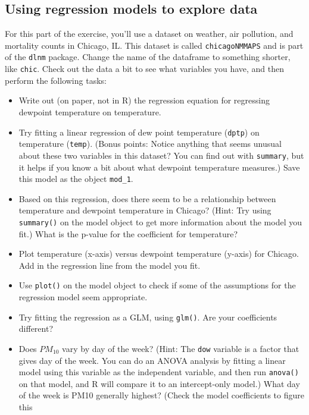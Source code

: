 \documentclass[]{book}
\providecommand{\tightlist}{%
  \setlength{\itemsep}{0pt}\setlength{\parskip}{0pt}}
\begin{document}
\subsection{Using regression models to explore
data}\label{using-regression-models-to-explore-data}

For this part of the exercise, you'll use a dataset on weather, air
pollution, and mortality counts in Chicago, IL. This dataset is called
\texttt{chicagoNMMAPS} and is part of the \texttt{dlnm} package. Change
the name of the dataframe to something shorter, like \texttt{chic}.
Check out the data a bit to see what variables you have, and then
perform the following tasks:

\begin{itemize}
\tightlist
\item
  Write out (on paper, not in R) the regression equation for regressing
  dewpoint temperature on temperature.
\item
  Try fitting a linear regression of dew point temperature
  (\texttt{dptp}) on temperature (\texttt{temp}). (Bonus points: Notice
  anything that seems unusual about these two variables in this dataset?
  You can find out with \texttt{summary}, but it helps if you know a bit
  about what dewpoint temperature measures.) Save this model as the
  object \texttt{mod\_1}.
\item
  Based on this regression, does there seem to be a relationship between
  temperature and dewpoint temperature in Chicago? (Hint: Try using
  \texttt{summary()} on the model object to get more information about
  the model you fit.) What is the p-value for the coefficient for
  temperature?
\item
  Plot temperature (x-axis) versus dewpoint temperature (y-axis) for
  Chicago. Add in the regression line from the model you fit.
\item
  Use \texttt{plot()} on the model object to check if some of the
  assumptions for the regression model seem appropriate.
\item
  Try fitting the regression as a GLM, using \texttt{glm()}. Are your
  coefficients different?
\item
  Does \(PM_{10}\) vary by day of the week? (Hint: The \texttt{dow}
  variable is a factor that gives day of the week. You can do an ANOVA
  analysis by fitting a linear model using this variable as the
  independent variable, and then run \texttt{anova()} on that model, and
  R will compare it to an intercept-only model.) What day of the week is
  PM10 generally highest? (Check the model coefficients to figure this

\end{itemize}
\end{document}
